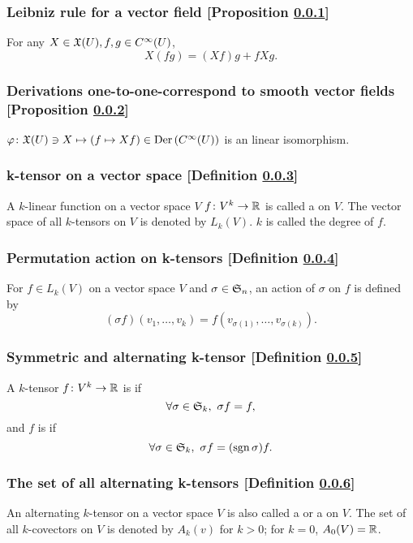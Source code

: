 \subsubsection{Leibniz rule for a vector field [Proposition \ref{leibniz-rule-for-a-vector-field}]}\label{leibniz-rule-for-a-vector-field}
For any $X \in \mathfrak{X}(U), f, g \in C^\infty(U)$,
\[
X(fg) = (Xf)g + fXg.
\]

\subsubsection{Derivations one-to-one-correspond to smooth vector fields [Proposition \ref{derivations-one-to-one-correspond-to-smooth-vector-fields}]}\label{derivations-one-to-one-correspond-to-smooth-vector-fields}
$\varphi \colon \mathfrak{X}(U) \ni X \mapsto (f \mapsto Xf) \in \mathrm{Der}\, (C^\infty(U))$ is an linear isomorphism.

\subsubsection{k-tensor on a vector space [Definition \ref{k-tensor-on-a-vector-space}]}\label{k-tensor-on-a-vector-space}
A $k$-linear function on a vector space $V$ $f \colon V^k \to \mathbb{R}$ is called a  on $V$. The vector space of all $k$-tensors on $V$ is denoted by $L_k(V)$. $k$ is called the degree of $f$.

\subsubsection{Permutation action on k-tensors [Definition \ref{permutation-action-on-k-tensors}]}\label{permutation-action-on-k-tensors}
For $f \in L_k(V)$ on a vector space $V$ and $\sigma \in \mathfrak{S}_n$, an action of $\sigma $ on $f$ is defined by
\[
(\sigma f)(v_1, \dotsc, v_k) = f(v_{\sigma(1)},\dotsc, v_{\sigma(k)}).
\]

\subsubsection{Symmetric and alternating k-tensor [Definition \ref{symmetric-and-alternating-k-tensor}]}\label{symmetric-and-alternating-k-tensor}
A $k$-tensor $f \colon V^k \to \mathbb{R}$ is  if
\[
\forall \sigma \in \mathfrak{S}_k,\ \sigma f  =f,
\]
and $f$ is  if
\[
\forall \sigma \in \mathfrak{S}_k,\ \sigma f = (\operatorname{sgn} \sigma) f.
\]

\subsubsection{The set of all alternating k-tensors [Definition \ref{the-set-of-all-alternating-k-tensor}]}\label{the-set-of-all-alternating-k-tensor}
An alternating $k$-tensor on a vector space $V$ is also called a  or a  on $V$. The set of all $k$-covectors on $V$ is denoted by $A_k(v)$ for $k > 0$; for $k = 0$, $A_0 (V) = \mathbb{R}$.

